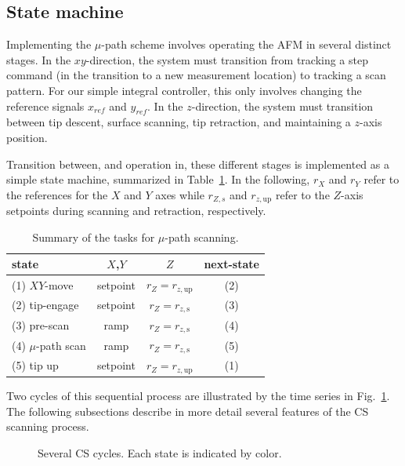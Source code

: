 \documentclass[twocolumn,oneside]{IEEEtran/IEEEtran}
\newcommand{\rzup}{\ensuremath{r_{z,\textrm{up}}}\xspace}
\newcommand{\rzs}{\ensuremath{r_{z,\textrm{s}}}\xspace}
\begin{document}
\subsection{State machine}
Implementing the $\mu$-path scheme involves operating the AFM in several
distinct stages. In the $xy$-direction, the system must transition from tracking
a step command (in the transition to a new measurement location) to tracking a
scan pattern. For our simple integral controller, this only involves changing
the reference signals $x_{ref}$ and $y_{ref}$.
In the $z$-direction, the system
must transition between tip descent, surface scanning, tip retraction, and
maintaining a $z$-axis position.

	
Transition between, and operation in, these different stages is implemented as a
simple state machine, summarized in Table~\ref{tab:cs_tasks}. 
In the following, $r_X$ and $r_Y$ refer to the references for the $X$ and $Y$ axes while $r_{Z,s}$ and $\rzup$ refer to the $Z$-axis setpoints during scanning and retraction, respectively.

\begin{table}
  \centering
  \caption{Summary of the tasks for $\mu$-path scanning.}
  \begin{tabular}{lccc}
    state & $X$,$Y$ & $Z$ & next-state\\
    \toprule
    (1) $XY$-move & setpoint & $r_Z = \rzup$ & (2)\\
    (2) tip-engage & setpoint & $r_Z = \rzs$ & (3)\\
    (3) pre-scan & ramp & $r_Z = \rzs$ & (4)\\
    (4) $\mu$-path scan & ramp & $r_Z = \rzs$ & (5)\\
    (5) tip up & setpoint & $r_Z = \rzup$ & (1)\\
  \end{tabular}
  \label{tab:cs_tasks}
\end{table}
Two cycles of this sequential process are illustrated by the time series in
Fig.~\ref{fig:mupathsignaltrajectory}. The following subsections describe in
more detail several features of the CS scanning process.
  
\begin{figure}[t!]
  \centering
  
  \caption{Several CS cycles. Each state is indicated by color.}
  \label{fig:mupathsignaltrajectory}
\end{figure}
\end{document}
